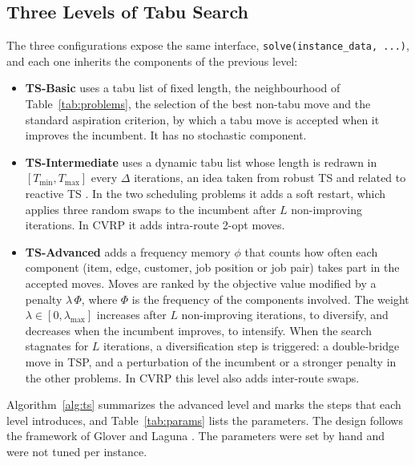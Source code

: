 \documentclass[engproc,proceedingpaper,submit,moreauthors]{Definitions/mdpi}
\begin{document}
\subsection{Three Levels of Tabu Search}

The three configurations expose the same interface, \texttt{solve(instance\_data, ...)}, and each one inherits the components of the previous level:
\begin{itemize}
\item \textbf{TS-Basic} uses a tabu list of fixed length, the neighbourhood of Table~\ref{tab:problems}, the selection of the best non-tabu move and the standard aspiration criterion, by which a tabu move is accepted when it improves the incumbent. It has no stochastic component.
\item \textbf{TS-Intermediate} uses a dynamic tabu list whose length is redrawn in $[T_{\min}, T_{\max}]$ every $\Delta$ iterations, an idea taken from robust TS \cite{taillard1991robust} and related to reactive TS \cite{battiti1994reactive}. In the two scheduling problems it adds a soft restart, which applies three random swaps to the incumbent after $L$ non-improving iterations. In CVRP it adds intra-route 2-opt moves.
\item \textbf{TS-Advanced} adds a frequency memory $\phi$ that counts how often each component (item, edge, customer, job position or job pair) takes part in the accepted moves. Moves are ranked by the objective value modified by a penalty $\lambda \, \Phi$, where $\Phi$ is the frequency of the components involved. The weight $\lambda \in [0, \lambda_{\max}]$ increases after $L$ non-improving iterations, to diversify, and decreases when the incumbent improves, to intensify. When the search stagnates for $L$ iterations, a diversification step is triggered: a double-bridge move \cite{martin1992large} in TSP, and a perturbation of the incumbent or a stronger penalty in the other problems. In CVRP this level also adds inter-route swaps.
\end{itemize}

Algorithm~\ref{alg:ts} summarizes the advanced level and marks the steps that each level introduces, and Table~\ref{tab:params} lists the parameters. The design follows the framework of Glover and Laguna \cite{glover1997tabu}. The parameters were set by hand and were not tuned per instance.
\end{document}
